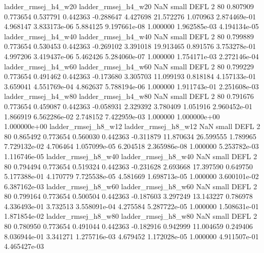      ladder_rmsej_h4_w20      ladder_rmsej_h4_w20                   NaN      small     DEFL                 2 80 0.807909       0.773654 0.537791       0.442363   -0.288647      4.427698     21.572276     1.070963   2.874469e-01  4.968147 3.833173e-06     5.884125   9.197661e-08            1.000000    1.962585e-03        4.194134e-05
     ladder_rmsej_h4_w40      ladder_rmsej_h4_w40                   NaN      small     DEFL                 2 80 0.799889       0.773654 0.530453       0.442363   -0.269102      3.391018     19.913465     0.891576   3.753278e-01  4.997206 3.419437e-06     5.462426   5.284060e-07            1.000000    1.754171e-03        2.272146e-04
     ladder_rmsej_h4_w60      ladder_rmsej_h4_w60                   NaN      small     DEFL                 2 80 0.799229       0.773654 0.491462       0.442363   -0.173680      3.305703     11.099193     0.818184   4.157133e-01  3.659041 4.551769e-04     4.862637   5.788194e-06            1.000000    1.911743e-01        2.251608e-03
     ladder_rmsej_h4_w80      ladder_rmsej_h4_w80                   NaN      small     DEFL                 2 80 0.791676       0.773654 0.459087       0.442363   -0.058931      2.329392      3.780409     1.051916   2.960452e-01  1.866919 6.562286e-02     2.748152   7.422959e-03            1.000000    1.000000e+00        1.000000e+00
     ladder_rmsej_h8_w12      ladder_rmsej_h8_w12                   NaN      small     DEFL                 2 80 0.865492       0.773654 0.560030       0.442363   -0.311879     11.870634     26.599555     1.789965   7.729132e-02  4.706464 1.057099e-05     6.204518   2.365986e-08            1.000000    5.253782e-03        1.116746e-05
     ladder_rmsej_h8_w40      ladder_rmsej_h8_w40                   NaN      small     DEFL                 2 80 0.794494       0.773654 0.519324       0.442363   -0.231628      2.693668     17.397590     0.649750   5.177388e-01  4.170779 7.725538e-05     4.581669   1.698713e-05            1.000000    3.600101e-02        6.387162e-03
     ladder_rmsej_h8_w60      ladder_rmsej_h8_w60                   NaN      small     DEFL                 2 80 0.799164       0.773654 0.500504       0.442363   -0.187603      3.297249     13.143227     0.786978   4.336493e-01  3.732513 3.558091e-04     4.275584   5.287722e-05            1.000000    1.508631e-01        1.871854e-02
     ladder_rmsej_h8_w80      ladder_rmsej_h8_w80                   NaN      small     DEFL                 2 80 0.780950       0.773654 0.491044       0.442363   -0.182916      0.942999     11.004659     0.249406   8.036944e-01  3.341271 1.275716e-03     4.679452   1.172028e-05            1.000000    4.911507e-01        4.465427e-03
